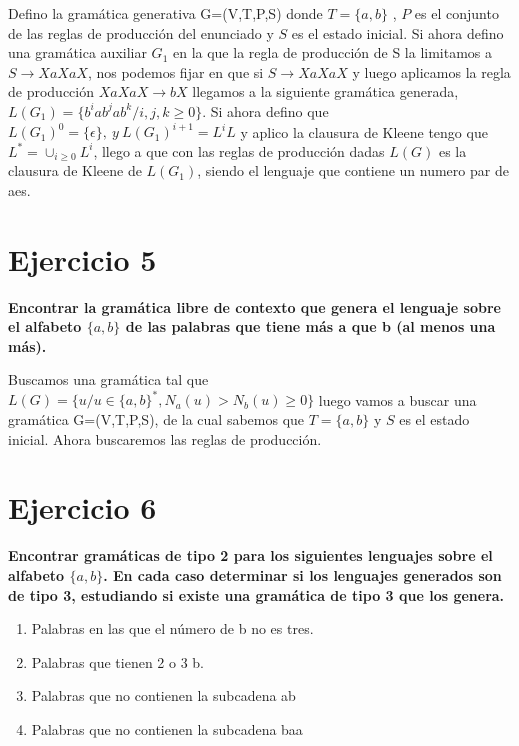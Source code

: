 \documentclass[a4paper,11pt]{article}
\begin{document}
Defino la gramática generativa G=(V,T,P,S) donde $T=\{a,b\}$ , $P$ es el conjunto de las reglas de producción del enunciado y $S$ es el estado inicial. Si ahora defino una gramática auxiliar $G_1$ en la que la regla de producción de S la limitamos a $S \rightarrow XaXaX$, nos podemos fijar en que si $S \rightarrow XaXaX$ y luego aplicamos la regla de producción $XaXaX \rightarrow bX$ llegamos a la siguiente gramática generada, $L(G_1) = \{b^iab^jab^k / i,j,k \geq 0\}$. Si ahora defino que $L(G_1)^0=\{\epsilon\}, \> y \> L(G_1)^{i+1}=L^iL$ y aplico la clausura de Kleene tengo que $L^* = \cup_{i \geq 0}L^i$, llego a que con las reglas de producción dadas $L(G)$ es la clausura de Kleene de $L(G_1)$, siendo el lenguaje que contiene un numero par de aes.

\section{Ejercicio 5}
\textbf{Encontrar la gramática libre de contexto que genera el lenguaje sobre el alfabeto $\{a,b\}$ de las palabras que tiene más a que b (al menos una más).}

Buscamos una gramática tal que $L(G)=\{u / u \in \{a,b\}^*, N_a(u)>N_b(u)\geq 0\}$ luego vamos a buscar una gramática G=(V,T,P,S), de la cual sabemos que $T=\{a,b\}$ y $S$ es el estado inicial. Ahora buscaremos las reglas de producción.

\section{Ejercicio 6}
\textbf{Encontrar gramáticas de tipo 2 para los siguientes lenguajes sobre el alfabeto $\{a,b\}$. En cada caso determinar si los lenguajes generados son de tipo 3, estudiando si existe una gramática de tipo 3 que los genera.}

\begin{enumerate}
\item Palabras en las que el número de b no es tres.
\item Palabras que tienen 2 o 3 b.
\item Palabras que no contienen la subcadena ab
\item Palabras que no contienen la subcadena baa
\end{enumerate}
\end{document}
